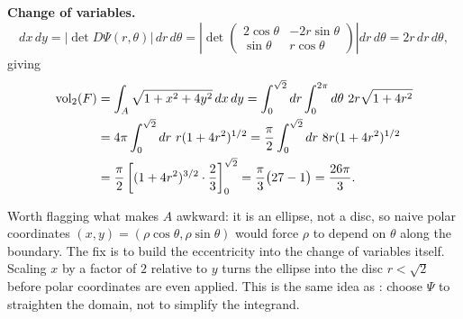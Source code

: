 \begin{example}
\textbf{Change of variables.}
\[dx\,dy = |\det D\Psi(r,\theta)|\,dr\,d\theta
  = \left|\det\begin{pmatrix} 2\cos\theta & -2r\sin\theta \\ \sin\theta & r\cos\theta
    \end{pmatrix}\right| dr\,d\theta = 2r\,dr\,d\theta,\]
giving
\[
\begin{aligned}
\operatorname{vol}_2(F) &= \int_A \sqrt{1+x^2+4y^2}\,dx\,dy
  = \int_0^{\sqrt2} dr\int_0^{2\pi} d\theta\ 2r\sqrt{1+4r^2} \\
  &= 4\pi\int_0^{\sqrt2} dr\ r(1+4r^2)^{1/2}
   = \frac\pi2\int_0^{\sqrt2} dr\ 8r(1+4r^2)^{1/2} \\
  &= \frac\pi2\left[(1+4r^2)^{3/2}\cdot\frac23\right]_0^{\sqrt2}
   = \frac\pi3\big(27-1\big) = \frac{26\pi}{3}.
\end{aligned}
\]
\end{example}

\begin{ainote}
Worth flagging what makes $A$ awkward: it is an ellipse, not a disc, so naive polar
coordinates $(x,y)=(\rho\cos\theta,\rho\sin\theta)$ would force $\rho$ to depend on $\theta$
along the boundary. The fix is to build the eccentricity into the change of variables itself.
Scaling $x$ by a factor of $2$ relative to $y$ turns the ellipse into the disc $r<\sqrt2$
before polar coordinates are even applied. This is the same idea as
: choose $\Psi$ to straighten the domain, not
to simplify the integrand.
\end{ainote}

